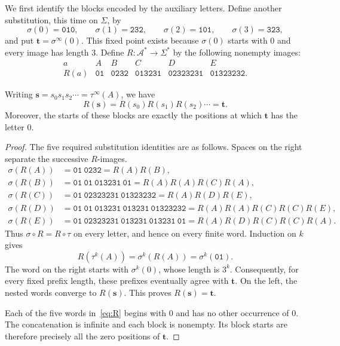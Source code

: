 \documentclass[12pt,reqno]{article}
\newcommand{\word}[1]{\mathtt{#1}}
\newcommand{\wt}{\mathbf{t}}
\newcommand{\ws}{\mathbf{s}}
\begin{document}
We first identify the blocks encoded by the auxiliary letters. Define
another substitution, this time on $\Sigma$, by
\begin{equation}\label{eq:sigma}
  \sigma(0)=\word{010},\qquad
  \sigma(1)=\word{232},\qquad
  \sigma(2)=\word{101},\qquad
  \sigma(3)=\word{323},
\end{equation}
and put $\wt=\sigma^\infty(0)$. This fixed point exists because
$\sigma(0)$ starts with $0$ and every image has length $3$.
Define $R:\mathcal A^*\to\Sigma^*$ by the following nonempty images:
\begin{equation}\label{eq:R}
\begin{array}{c|ccccc}
a&A&B&C&D&E\\ \hline
R(a)&\word{01}&\word{0232}&\word{013231}&
\word{02323231}&\word{01323232}.
\end{array}
\end{equation}

\begin{lemma}\label{lem:returns}
Writing $\ws=s_0s_1s_2\cdots=\tau^\infty(A)$, we have
\[
  R(\ws)=R(s_0)R(s_1)R(s_2)\cdots=\wt.
\]
Moreover, the starts of these blocks are exactly the positions at which
$\wt$ has the letter $0$.
\end{lemma}

\begin{proof}
The five required substitution identities are as follows. Spaces on the
right separate the successive $R$-images.
\begin{align*}
\sigma(R(A))&=\word{01\ 0232}
             =R(A)R(B),\\
\sigma(R(B))&=\word{01\ 01\ 013231\ 01}
             =R(A)R(A)R(C)R(A),\\
\sigma(R(C))&=\word{01\ 02323231\ 01323232}
             =R(A)R(D)R(E),\\
\sigma(R(D))&=\word{01\ 01\ 013231\ 013231\ 01323232}
             =R(A)R(A)R(C)R(C)R(E),\\
\sigma(R(E))&=\word{01\ 02323231\ 013231\ 013231\ 01}
             =R(A)R(D)R(C)R(C)R(A).
\end{align*}
Thus $\sigma\circ R=R\circ\tau$ on every letter, and hence on every
finite word. Induction on $k$ gives
\[
  R(\tau^k(A))=\sigma^k(R(A))=\sigma^k(\word{01}).
\]
The word on the right starts with $\sigma^k(0)$, whose length is $3^k$.
Consequently, for every fixed prefix length, these prefixes eventually
agree with $\wt$. On the left, the nested words converge to $R(\ws)$.
This proves $R(\ws)=\wt$.

Each of the five words in~\eqref{eq:R} begins with $0$ and has no other
occurrence of $0$. The concatenation is infinite and each block is
nonempty. Its block starts are therefore precisely all the zero
positions of $\wt$.
\end{proof}
\end{document}
